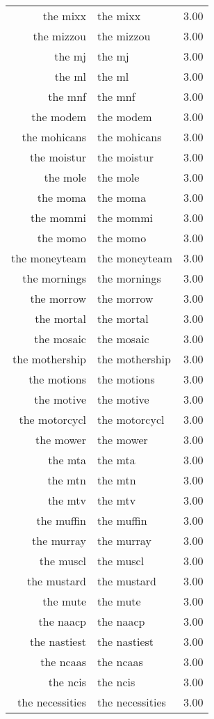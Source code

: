 \begin{table}[ht]
\begin{tabular}{rlr}
  the mixx & the mixx & 3.00 \\ 
  the mizzou & the mizzou & 3.00 \\ 
  the mj & the mj & 3.00 \\ 
  the ml & the ml & 3.00 \\ 
  the mnf & the mnf & 3.00 \\ 
  the modem & the modem & 3.00 \\ 
  the mohicans & the mohicans & 3.00 \\ 
  the moistur & the moistur & 3.00 \\ 
  the mole & the mole & 3.00 \\ 
  the moma & the moma & 3.00 \\ 
  the mommi & the mommi & 3.00 \\ 
  the momo & the momo & 3.00 \\ 
  the moneyteam & the moneyteam & 3.00 \\ 
  the mornings & the mornings & 3.00 \\ 
  the morrow & the morrow & 3.00 \\ 
  the mortal & the mortal & 3.00 \\ 
  the mosaic & the mosaic & 3.00 \\ 
  the mothership & the mothership & 3.00 \\ 
  the motions & the motions & 3.00 \\ 
  the motive & the motive & 3.00 \\ 
  the motorcycl & the motorcycl & 3.00 \\ 
  the mower & the mower & 3.00 \\ 
  the mta & the mta & 3.00 \\ 
  the mtn & the mtn & 3.00 \\ 
  the mtv & the mtv & 3.00 \\ 
  the muffin & the muffin & 3.00 \\ 
  the murray & the murray & 3.00 \\ 
  the muscl & the muscl & 3.00 \\ 
  the mustard & the mustard & 3.00 \\ 
  the mute & the mute & 3.00 \\ 
  the naacp & the naacp & 3.00 \\ 
  the nastiest & the nastiest & 3.00 \\ 
  the ncaas & the ncaas & 3.00 \\ 
  the ncis & the ncis & 3.00 \\ 
  the necessities & the necessities & 3.00 \\ 

\end{tabular}
\end{table}
